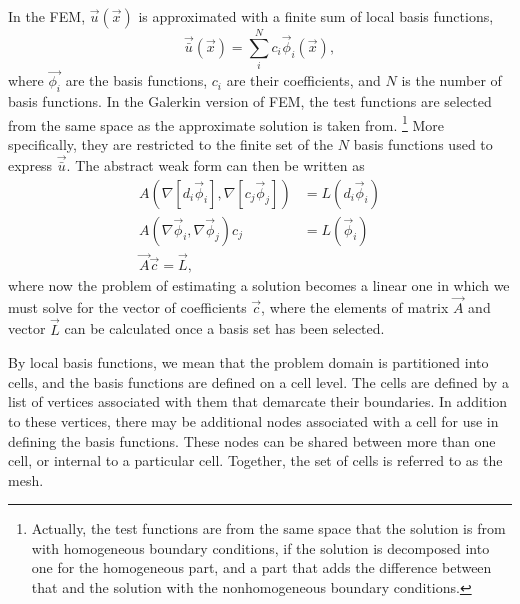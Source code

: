 In the \ac{FEM}, $\vec{u}(\vec{x})$ is approximated with a finite sum of local basis functions,
\begin{equation}
    \vec{\bar{u}}(\vec{x}) = \sum_{i}^{N} c_{i} \vec{\phi}_{i}(\vec{x}), \label{eq:approx-deformation}
\end{equation}
where $\vec{\phi_{i}}$ are the basis functions, $c_{i}$ are their coefficients, and $N$ is the number of basis functions.
In the Galerkin version of \ac{FEM}, the test functions are selected from the same space as the approximate solution is taken from.%
\footnote{Actually, the test functions are from the same space that the solution is from with homogeneous boundary conditions, if the solution is decomposed into one for the homogeneous part, and a part that adds the difference between that and the solution with the nonhomogeneous boundary conditions.}
More specifically, they are restricted to the finite set of the $N$ basis functions used to express $\vec{\bar{u}}$.
The abstract weak form can then be written as
\begin{align}
    A(\nabla [d_{i} \vec{\phi}_{i}], \nabla [c_{j} \vec{\phi}_{j}]) &= L(d_{i} \vec{\phi}_{i}) \nonumber\\
    A(\nabla \vec{\phi}_{i}, \nabla \vec{\phi}_{j})c_{j} &= L(\vec{\phi}_{i}) \nonumber\\
    \vec{A} \vec{c} = \vec{L},
\end{align}
where now the problem of estimating a solution becomes a linear one in which we must solve for the vector of coefficients $\vec{c}$, where the elements of matrix $\vec{A}$ and vector $\vec{L}$ can be calculated once a basis set has been selected.

By local basis functions, we mean that the problem domain is partitioned into cells, and the basis functions are defined on a cell level.
The cells are defined by a list of vertices associated with them that demarcate their boundaries.
In addition to these vertices, there may be additional nodes associated with a cell for use in defining the basis functions.
These nodes can be shared between more than one cell, or internal to a particular cell.
Together, the set of cells is referred to as the mesh.

